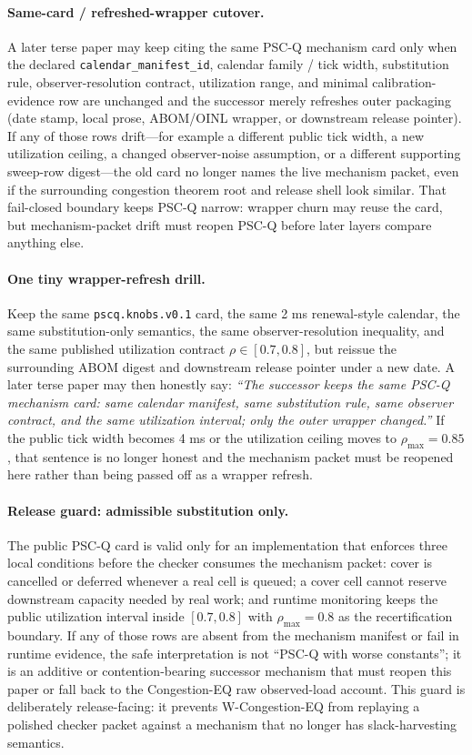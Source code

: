 \documentclass[11pt]{article}
\theoremstyle{definition}
\theoremstyle{remark}
\begin{document}
\paragraph{Same-card / refreshed-wrapper cutover.}
A later terse paper may keep citing the same PSC-Q mechanism card only when the declared \texttt{calendar\_manifest\_id}, calendar family / tick width, substitution rule, observer-resolution contract, utilization range, and minimal calibration-evidence row are unchanged and the successor merely refreshes outer packaging (date stamp, local prose, ABOM/OINL wrapper, or downstream release pointer). If any of those rows drift---for example a different public tick width, a new utilization ceiling, a changed observer-noise assumption, or a different supporting sweep-row digest---the old card no longer names the live mechanism packet, even if the surrounding congestion theorem root and release shell look similar. That fail-closed boundary keeps PSC-Q narrow: wrapper churn may reuse the card, but mechanism-packet drift must reopen PSC-Q before later layers compare anything else.\cite{series:abom,anondht_release_receipts}

\paragraph{One tiny wrapper-refresh drill.}
Keep the same \texttt{pscq.knobs.v0.1} card, the same 2 ms renewal-style calendar, the same substitution-only semantics, the same observer-resolution inequality, and the same published utilization contract $\rho\in[0.7,0.8]$, but reissue the surrounding ABOM digest and downstream release pointer under a new date. A later terse paper may then honestly say: \emph{``The successor keeps the same PSC-Q mechanism card: same calendar manifest, same substitution rule, same observer contract, and the same utilization interval; only the outer wrapper changed.''} If the public tick width becomes 4 ms or the utilization ceiling moves to $\rho_{\max}=0.85$, that sentence is no longer honest and the mechanism packet must be reopened here rather than being passed off as a wrapper refresh.

\paragraph{Release guard: admissible substitution only.}
The public PSC-Q card is valid only for an implementation that enforces three local conditions before the checker consumes the mechanism packet: cover is cancelled or deferred whenever a real cell is queued; a cover cell cannot reserve downstream capacity needed by real work; and runtime monitoring keeps the public utilization interval inside $[0.7,0.8]$ with $\rho_{\max}=0.8$ as the recertification boundary.  If any of those rows are absent from the mechanism manifest or fail in runtime evidence, the safe interpretation is not ``PSC-Q with worse constants''; it is an additive or contention-bearing successor mechanism that must reopen this paper or fall back to the Congestion-EQ raw observed-load account.  This guard is deliberately release-facing: it prevents W-Congestion-EQ from replaying a polished checker packet against a mechanism that no longer has slack-harvesting semantics.
\end{document}
